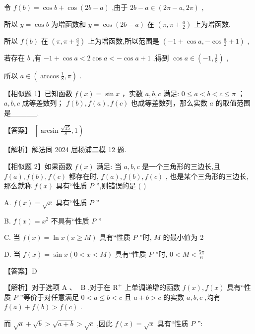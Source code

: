 \documentclass[10pt]{article}
\newcommand*\circled[1]{\tikz[baseline=(char.base)]{\node[shape=circle,draw,inner sep=1.5pt] (char) {\small #1};}}
\begin{document}
令 \(f\left( b\right)  = \cos b + \cos \left( {{2b} - a}\right)\) ,由于 \({2b} - a \in  \left( {{2\pi } - a,{2\pi }}\right)\) ,

所以 \(y = \cos b\) 为增函数和 \(y = \cos \left( {{2b} - a}\right)\) 在 \(\left( {\pi ,\pi  + \frac{a}{2}}\right)\) 上为增函数.

所以 \(f\left( b\right)\) 在 \(\left( {\pi ,\pi  + \frac{a}{2}}\right)\) 上为增函数,所以范围是 \(\left( {-1 + \cos a, - \cos \frac{a}{2} + 1}\right)\) ,

若存在 \(b\) ,有 \(- 1 + \cos a < 2\cos a <  - \cos a + 1\) ,得到 \(\cos a \in  \left( {-1,\frac{1}{8}}\right)\) ,

所以 \(a \in  \left( {\arccos \frac{1}{8},\pi }\right)\) .

【相似题 1】已知函数 \(f\left( x\right)  = \sin x\) ，实数 \(a,b,c\) 满足: \circled{1}  \(0 \leq  a < b < c \leq  \pi\) ； \circled{2}  \(a,b,c\) 成等差数列；  \circled{3}  \(f\left( b\right) ,f\left( a\right) ,f\left( c\right)\) 也成等差数列，那么实数 \(a\) 的取值范围是\_\_\_\_\_.

【答案】 \(\left\lbrack  {\arcsin \frac{\sqrt{15}}{8},1}\right)\)

【解析】解法同 2024 届杨浦二模 12 题.

【相似题 2】如果函数 \(f\left( x\right)\) 满足: 当 \(a,b,c\) 是一个三角形的三边长,且 \(f\left( a\right) ,f\left( b\right) ,f\left( c\right)\) 都存在时, \(f\left( a\right) ,f\left( b\right) ,f\left( c\right)\) , 也是某个三角形的三边长,那么就称 \(f\left( x\right)\) 具有“性质 \(P\) ”,则错误的是 ( )

A. \(f\left( x\right)  = \sqrt{x}\) 具有“性质 \(P\) ”

B. \(f\left( x\right)  = {x}^{2}\) 不具有“性质 \(P\) ”

C. 当 \(f\left( x\right)  = \ln x\left( {x \geq  M}\right)\) 具有“性质 \(P\) ”时, \(M\) 的最小值为 2

D. 当 \(f\left( x\right)  = \sin x\left( {0 < x < M}\right)\) 具有“性质 \(P\) ”时, \(0 < M < \frac{5\pi }{6}\)

【答案】D

【解析】对于选项 \(\mathrm{A}\text{ 、 }\mathrm{\;B}\) ,对于在 \({\mathrm{R}}^{ + }\) 上单调递增的函数 \(f\left( x\right) ,f\left( x\right)\) 具有“性质 \(P\) ”等价于对任意满足 \(0 < a \leq  b < c\) 且 \(a + b > c\) 的实数 \(a,b,c\) ,均有 \(f\left( a\right)  + f\left( b\right)  > f\left( c\right)\) .

而 \(\sqrt{a} + \sqrt{b} > \sqrt{a + b} > \sqrt{c}\) ,因此 \(f\left( x\right)  = \sqrt{x}\) 具有“性质 \(P\) ”:
\end{document}
